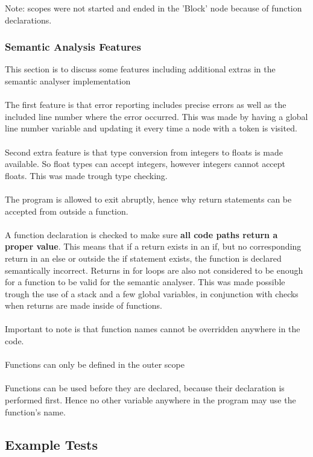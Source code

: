 Note: scopes were not started and ended in the 'Block' node because of function declarations.

\subsubsection{Semantic Analysis Features}
This section is to discuss some features including additional extras in the semantic analyser implementation
\\\\
The first feature is that error reporting includes precise errors as well as the included line number where the error occurred. This was made by having a global line number variable and updating it every time a node with a token is visited.
\\\\
Second extra feature is that type conversion from integers to floats is made available. So float types can accept integers, however integers cannot accept floats. This was made trough type checking.
\\\\
The program is allowed to exit abruptly, hence why return statements can be accepted from outside a function.
\\\\
A function declaration is checked to make sure \textbf{all code paths return a proper value}. This means that if a return exists in an if, but no corresponding return in an else or outside the if statement exists, the function is declared semantically incorrect. Returns in for loops are also not considered to be enough for a function to be valid for the semantic analyser. This was made possible trough the use of a stack and a few global variables, in conjunction with checks when returns are made inside of functions.
\\\\
Important to note is that function names cannot be overridden anywhere in the code.
\\\\
Functions can only be defined in the outer scope
\\\\ Functions can be used before they are declared, because their declaration is performed first. Hence no other variable anywhere in the program may use the function's name.

\subsection{Example Tests}


